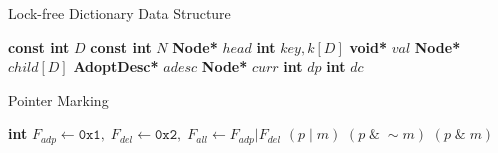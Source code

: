 \documentclass[10pt,conference,compsocconf]{IEEEtran}
\begin{document}
\label{sec:cpdict}
\setlength{\columnsep}{8pt}
\begin{algorithm}[t]
    \caption{Lock-free Dictionary Data Structure}
    \label{alg:pqstructure}
    \vspace{-0.2in}
    \begin{multicols}{2}
        \begin{algorithmic}[1]
            \State \textbf{const int} $D$
            \State \textbf{const int} $N$
            \State \textbf{Node*} $head$
            \EndClass
            \Statex
            \State \textbf{int} $key, k[D]$
            \State \textbf{void*} $val$
            \State \textbf{Node*} $child[D]$
            \State \textbf{AdoptDesc*} $adesc$
            \EndStruct
            \Statex
            \State \textbf{Node*} $curr$
            \State \textbf{int} $dp$ 
            \State \textbf{int} $dc$ 
            \EndStruct
            \Statex
        \end{algorithmic}
    \end{multicols}
    \vspace{-0.18in}
\end{algorithm}

\begin{algorithm}[t]
    \caption{Pointer Marking}
    \label{alg:pointermarking}
    \begin{algorithmic}[1]
        \State \textbf{int} $F_{adp} \gets \texttt{0x1},\;F_{del} \gets \texttt{0x2},\;F_{all} \gets F_{adp} | F_{del}$
         $(p\;|\;m)$
        \EndDefine
         $(p\;\&\;\sim m)$
        \EndDefine
         $(p\;\&\;m)$
        \EndDefine
    \end{algorithmic}
\end{algorithm}
\end{document}
